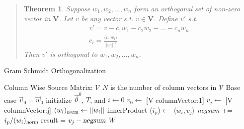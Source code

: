 \documentclass[11pt]{article}
\newtheorem{thm}{Theorem}[section]
\begin{document}
\begin{quote}
\begin{thm} 
\label{gso-theorem}
Suppose $w_1, w_2, ..., w_n$ form an orthogonal set of non-zero vector in $\mathbf{V}$.  Let $v$ be any vector s.t. $v \in \mathbf{V}$.  Define $v'$ s.t. 
\begin{eqnarray}
v' = v - c_1 w_1 - c_2 w_2 - ... - c_n w_n \\
c_i = \frac{\langle v , w_i \rangle} {||w_i||^2}
\end{eqnarray}
Then $v'$ is orthogonal to $w_1, w_2, ..., w_n$.
\end{thm} \cite[211]{schaums-linear-algebra}
\end{quote}


\begin{algorithm}
\caption{Gram Schmidt Orthogonalization}
\label{alg:gso}
\begin{algorithmic}
	\REQUIRE Column Wise Source Matrix: $\mathcal{V}$
	\STATE $N$ is the number of column vectors in $\mathcal{V}$
	\STATE Base case $\vec{v}_0 = \vec{w}_0$ 
	\STATE initialize $\vec{\theta}^0$, $T$, and $i \leftarrow 0$
	\STATE $v_0 \leftarrow $ [V columnVector:1]
		\STATE $v_j \leftarrow$ [V columnVector:j]
			\STATE $(w_i)_{\textsl{norm}} \leftarrow ||w_i ||$  
			\STATE innerProduct ($i_p$)$\leftarrow$ $\langle w_i , v_j \rangle$
			\STATE \textsl{negsum} += $i_p / (w_i)_{\textsl{norm}}$
		\ENDFOR
		\STATE result = $v_j - \textsl{negsum}$
	\ENDFOR
	\RETURN $W$
\end{algorithmic}
\end{algorithm}
\end{document}
